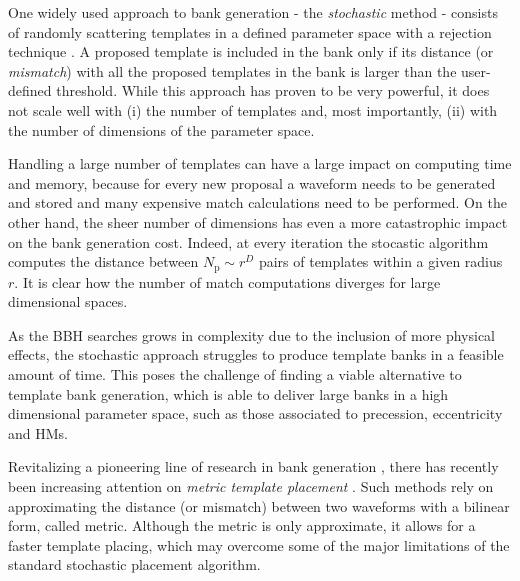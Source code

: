 \documentclass[twocolumn,showpacs,preprintnumbers,nofootinbib,prd,
superscriptaddress,10pt]{revtex4-2}
\begin{document}
One widely used approach to bank generation - the {\it stochastic} method \cite{Harry:2009ea, PhysRevD.80.104014, Ajith:2012mn} - consists of randomly scattering templates in a defined parameter space with a rejection technique \cite{DalCanton:2017ala, Mukherjee:2018yra, Indik:2016qky, Lenon:2021zac}. A proposed template is included in the bank only if its distance (or {\it mismatch}) with all the proposed templates in the bank is larger than the user-defined threshold.
While this approach has proven to be very powerful, it does not scale well with (i) the number of templates and, most importantly, (ii) with the number of dimensions of the parameter space.

Handling a large number of templates can have a large impact on computing time and memory, because for every new proposal a waveform needs to be generated and stored and many expensive match calculations need to be performed.
On the other hand, the sheer number of dimensions has even a more catastrophic impact on the bank generation cost. Indeed, at every iteration the stocastic algorithm computes the distance between $N_\text{p}\sim r^D$ pairs of templates within a given radius $r$. It is clear how the number of match computations diverges for large dimensional spaces.

As the BBH searches grows in complexity due to the inclusion of more physical effects, the stochastic approach struggles to produce template banks in a feasible amount of time.
This poses the challenge of finding a viable alternative to template bank generation, which is able to deliver large banks in a high dimensional parameter space, such as those associated to precession, eccentricity and HMs.

Revitalizing a pioneering line of research in bank generation \cite{owen_metric, Messenger:2008ta, Prix:2007ks, Brown:2012qf, Keppel:2013uma}, there has recently been increasing attention on {\it metric template placement} \cite{Roy:2017oul, 2018cosp...42E2899R, Coogan:2022qxs, Hanna:2022zpk}.
Such methods rely on approximating the distance (or mismatch) between two waveforms with a bilinear form, called metric.
Although the metric is only approximate, it allows for a faster template placing, which may overcome some of the major limitations of the standard stochastic placement algorithm.
\end{document}
